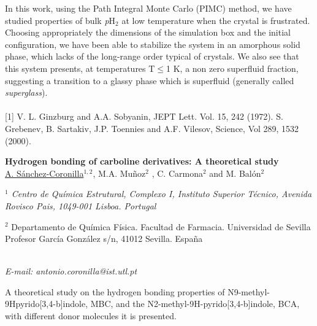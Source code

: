 In this work, using the Path Integral Monte Carlo (PIMC) method, we have studied properties of
bulk \textit{p}H$_{2}$ at low temperature when the crystal is frustrated. Choosing appropriately the dimensions
of the simulation box and the initial configuration, we have been able to stabilize the system in
an amorphous solid phase, which lacks of the long-range order typical of crystals. We also see
that this system presents, at temperatures T$\leq$1 K, a non zero superfluid fraction, suggesting a
transition to a glassy phase which is superfluid (generally called \textit{superglass}).
\\
\vspace{0.5cm}
\\
{\footnotesize
[1] V. L. Ginzburg and A.A. Sobyanin, JEPT Lett. Vol. 15, 242 (1972).
\newline
[2] S. Grebenev, B. Sartakiv, J.P. Toennies and A.F. Vilesov, Science, Vol 289, 1532 (2000).
\newline
}
\newpage
\setcounter{figure}{0}
\begin{center}
{\bf \Large
Hydrogen bonding of carboline derivatives: A theoretical
study
}
\\
\vspace{0.5cm}
\underline{A. Sánchez-Coronilla}$^{1,2}$, M.A. Muñoz$^{2}$ , C. Carmona$^{2}$ and M. Balón$^{2}$
\\
\vspace{0.5cm}
{\it
$^{1}$ Centro de Química Estrutural, Complexo I, Instituto Superior Técnico, Avenida Rovisco Pais,
1049-001 Lisboa. Portugal

$^{2}$ Departamento de Química Física. Facultad de Farmacia. Universidad de Sevilla
Profesor García González s/n, 41012 Sevilla. España
}
\\
\vspace{0.5cm}
{\it E-mail: antonio.coronilla@ist.utl.pt}
\\
\vspace{0.5cm}
\end{center}
A theoretical study on the hydrogen bonding properties of N9-methyl-9Hpyrido[3,4-b]indole, MBC,
and the N2-methyl-9H-pyrido[3,4-b]indole, BCA, with
different donor molecules it is presented.

